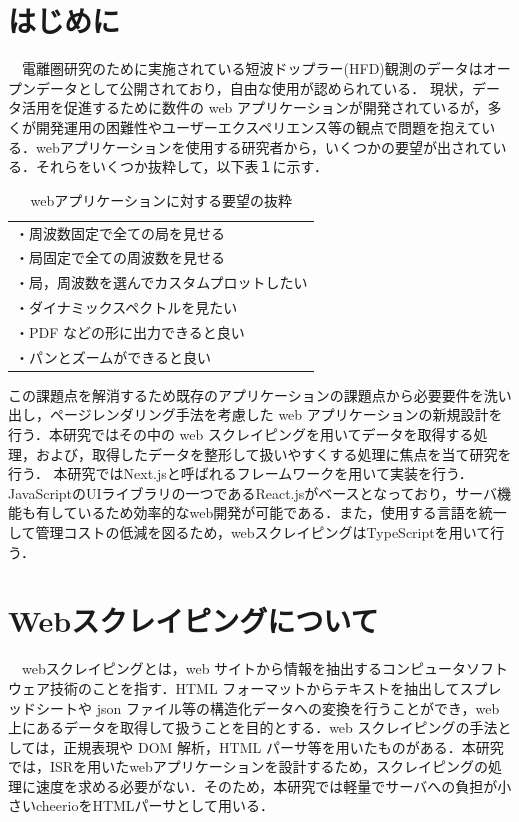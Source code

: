 \section{はじめに}

　電離圏研究のために実施されている短波ドップラー(HFD)観測のデータはオープンデータとして公開されており，自由な使用が認められている．
現状，データ活用を促進するために数件の web アプリケーションが開発されているが，多くが開発運用の困難性やユーザーエクスペリエンス等の観点で問題を抱えている．webアプリケーションを使用する研究者から，いくつかの要望が出されている．それらをいくつか抜粋して，以下表１に示す．
\begin{table}[h]
  \centering
  \caption{webアプリケーションに対する要望の抜粋}
  \label{tab:requst}
  \begin{tabular}{l}
  \toprule
     ・周波数固定で全ての局を見せる\\
    ・局固定で全ての周波数を見せる\\
    ・局，周波数を選んでカスタムプロットしたい\\
    ・ダイナミックスペクトルを見たい\\
    ・PDF などの形に出力できると良い\\
    ・パンとズームができると良い
  \end{tabular}
\end{table}
 この課題点を解消するため既存のアプリケーションの課題点から必要要件を洗い出し，ページレンダリング手法を考慮した web アプリケーションの新規設計を行う．本研究ではその中の web スクレイピングを用いてデータを取得する処理，および，取得したデータを整形して扱いやすくする処理に焦点を当て研究を行う．
本研究ではNext.jsと呼ばれるフレームワークを用いて実装を行う．JavaScriptのUIライブラリの一つであるReact.jsがベースとなっており，サーバ機能も有しているため効率的なweb開発が可能である．また，使用する言語を統一して管理コストの低減を図るため，webスクレイピングはTypeScriptを用いて行う．
\section{Webスクレイピングについて}

　webスクレイピングとは，web サイトから情報を抽出するコンピュータソフトウェア技術のことを指す．HTML フォーマットからテキストを抽出してスプレッドシートや json ファイル等の構造化データへの変換を行うことができ，web 上にあるデータを取得して扱うことを目的とする．web スクレイピングの手法としては，正規表現や DOM 解析，HTML パーサ等を用いたものがある．本研究では，ISRを用いたwebアプリケーションを設計するため，スクレイピングの処理に速度を求める必要がない．そのため，本研究では軽量でサーバへの負担が小さいcheerioをHTMLパーサとして用いる．
